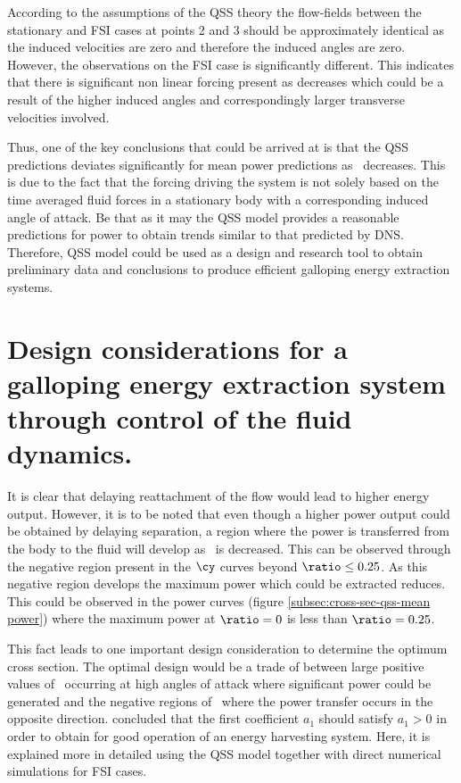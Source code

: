 According to the assumptions of the QSS theory the flow-fields between the stationary and FSI cases at points 2 and 3 should be approximately identical as the induced velocities are zero and therefore the induced angles are zero. However, the observations on the FSI case is significantly different. This indicates that there is significant non linear forcing present as \ratio decreases which could be a result of the higher induced angles and correspondingly larger transverse velocities involved. 

Thus, one of the key conclusions that could be arrived at is that the QSS predictions deviates significantly for mean power predictions as \ratio\ decreases. This is due to the fact that the forcing driving the system is not solely based on the time averaged fluid forces in a stationary body with a corresponding induced angle of attack. Be that as it may the QSS model provides a reasonable predictions for power to obtain trends similar to that predicted by DNS. Therefore, QSS model could be used as a design and research tool to obtain preliminary data and conclusions to produce efficient galloping energy extraction systems. 

\section{Design considerations for a galloping energy extraction system through control of the fluid dynamics.}
\label{subsec:design-considerations-cross-section}
  
It is clear that delaying reattachment of the flow would lead to higher energy output. However, it is to be noted that even though a higher power output could be obtained by delaying separation, a region where the power is transferred from the body to the fluid will develop as \ratio\ is decreased. This can be observed through the negative region present in the $\cy$ curves beyond $\ratio\leq0.25$. As this negative region develops the maximum power which could be extracted reduces. This could be observed in the power curves (figure \ref{subsec:cross-sec-qss-mean power}) where the maximum power at $\ratio=0$ is less than $\ratio=0.25$.

This fact leads to one important design consideration to determine the optimum cross section. The optimal design would be a trade of between large positive values of \cy\ occurring at high angles of attack where significant power could be generated and the negative regions of \cy\ where the power transfer occurs in the opposite direction. \citet{Barrero-Gil2010a} concluded that the first coefficient $a_1$ should satisfy  $a_1>0$ in order to obtain for good operation of an energy harvesting system. Here, it is explained more in detailed using the QSS model together with direct numerical simulations for FSI cases. 

